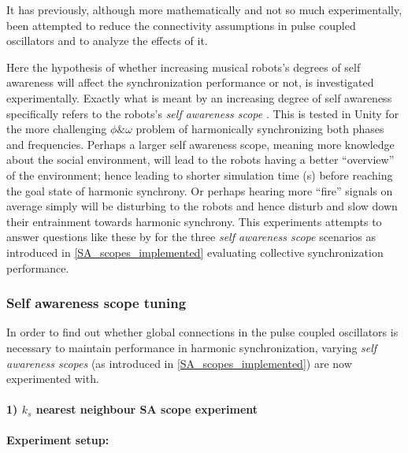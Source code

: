	It has previously, although more mathematically and not so much experimentally, been attempted to reduce the connectivity assumptions in pulse coupled oscillators \cite{minimally_connected_pcos} and to analyze the effects of it.
	
	Here the hypothesis of whether increasing musical robots's degrees of self awareness will affect the synchronization performance or not, is investigated experimentally. Exactly what is meant by an increasing degree of self awareness specifically refers to the robots's \textit{self awareness scope} \cite{sacs17_ch3}. This is tested in Unity for the more challenging $\phi \& \omega$ problem of harmonically synchronizing both phases and frequencies. Perhaps a larger self awareness scope, meaning more knowledge about the social environment, will lead to the robots having a better ``overview'' of the environment; hence leading to shorter simulation time (s) before reaching the goal state of harmonic synchrony. Or perhaps hearing more ``fire'' signals on average simply will be disturbing to the robots and hence disturb and slow down their entrainment towards harmonic synchrony. This experiments attempts to answer questions like these by for the three \textit{self awareness scope} scenarios as introduced in \ref{SA_scopes_implemented} evaluating collective synchronization performance.
	
	
		\subsubsection{Self awareness scope tuning}
		\label{phase_sync_SA_scopes_tuning}

		In order to find out whether global connections in the pulse coupled oscillators is necessary to maintain performance in harmonic synchronization, varying \textit{self awareness scopes} (as introduced in \ref{SA_scopes_implemented}) are now experimented with.
		
		
		
		
			\paragraph{1) $k_s$ nearest neighbour SA scope experiment}
			
				\paragraph{Experiment setup:\nl}
				
